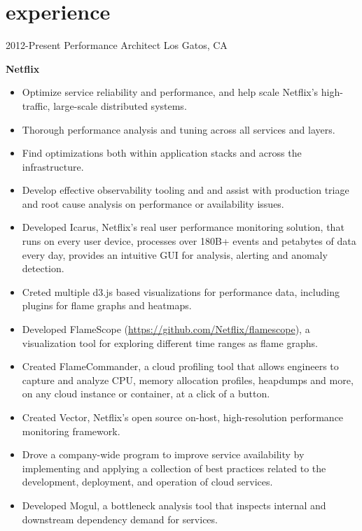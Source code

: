 \section{experience}

\begin{entrylist}
  \entry
    {2012-Present}
    {Performance Architect}
    {Los Gatos, CA}
    {
      \textbf{Netflix}
      \begin{itemize}
        \item Optimize service reliability and performance, and help scale Netflix's high-traffic, large-scale distributed systems.
        \item Thorough performance analysis and tuning across all services and layers.
        \item Find optimizations both within application stacks and across the infrastructure.
        \item Develop effective observability tooling and and assist with production triage and root cause analysis on performance or availability issues.  
      \end{itemize}
      \begin{itemize}
        \item Developed Icarus, Netflix's real user performance monitoring solution, that runs on every user device, processes over 180B+ events and petabytes of data every day, provides an intuitive GUI for analysis, alerting and anomaly detection.
        \item Creted multiple d3.js based visualizations for performance data, including plugins for flame graphs and heatmaps.
        \item Developed FlameScope (\href{github.com/Netflix/flamescope}{https://github.com/Netflix/flamescope}), a visualization tool for exploring different time ranges as flame graphs.
        \item Created FlameCommander, a cloud profiling tool that allows engineers to capture and analyze CPU, memory allocation profiles, heapdumps and more, on any cloud instance or container, at a click of a button.
        \item Created Vector, Netflix's open source on-host, high-resolution performance monitoring framework.
        \item Drove a company-wide program to improve service availability by implementing and applying a collection of best practices related to the development, deployment, and operation of cloud services.
        \item Developed Mogul, a bottleneck analysis tool that inspects internal and downstream dependency demand for services.

\end{itemize}}
\end{entrylist}
